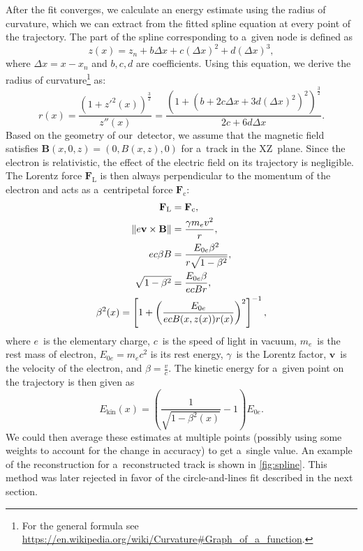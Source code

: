 		After the fit converges, we calculate an energy estimate using the radius of curvature, which we can extract from the fitted spline equation at every point of the trajectory. The part of the spline corresponding to a~given node is defined as
			\begin{equation}
				z(x) = z_n + b \Delta x+c(\Delta x)^2+d(\Delta x)^3,
			\end{equation}
		where $\Delta x = x-x_n$ and $b,c,d$ are coefficients. Using this equation, we derive the radius of curvature\footnote{For the general formula see \url{https://en.wikipedia.org/wiki/Curvature\#Graph_of_a_function}.} as:
			\begin{equation}
				r(x) = \frac{\left(1+z'^2(x)\right)^\frac{3}{2}}{z''(x)} = \frac{\left(1+\left(b+2c\Delta x+3d(\Delta x)^2\right)^2\right)^\frac{3}{2}}{2c+6d\Delta x}.
			\end{equation}
		Based on the geometry of our~detector, we assume that the magnetic field satisfies $\mathbf{B}(x,0,z) = (0,B(x,z),0)$ for a~track in the XZ~plane. Since the electron is relativistic, the effect of the electric field on its trajectory is negligible. The Lorentz force $\mathbf{F}_\text{L}$ is then always perpendicular to the momentum of the electron and acts as a~centripetal force $\mathbf{F}_\text{c}$:
			\begin{gather}
				\begin{aligned}
					\mathbf{F}_\text{L} &= \mathbf{F}_\text{c},\\
					\norm{e\mathbf{v}\times\mathbf{B}} &= \frac{\gamma m_e v^2}{r},\\
					e c\beta B &= \frac{E_{0e} \beta^2}{r\sqrt{1-\beta^2}},\\
					\sqrt{1-\beta^2} &= \frac{E_{0e} \beta}{ecBr},
				\end{aligned}\\
				\beta^2(x) = \left[1+\left(\frac{E_{0e}}{ecB(x,z(x))r(x)}\right)^2\right]^{-1}, \label{eq:ekin1}
			\end{gather}
		where $e$~is the elementary charge, $c$~is the speed of light in vacuum, $m_e$~is the rest mass of electron, $E_{0e} = m_e c^2$ is its rest energy, $\gamma$~is the Lorentz factor, $\mathbf{v}$~is the velocity of the electron, and $\beta = \frac{v}{c}$. The kinetic energy for a~given point on the trajectory is then given as
			\begin{equation}
				\label{eq:ekin2}
				E_\text{kin}(x) = \left(\frac{1}{\sqrt{1-\beta^2(x)}}-1\right)E_{0e}.
			\end{equation}
		We could then average these estimates at multiple points (possibly using some weights to account for the change in accuracy) to get a~single value. An example of the reconstruction for a~reconstructed track is shown in \cref{fig:spline}. This method was later rejected in favor of the circle-and-lines fit described in the next section.
		
